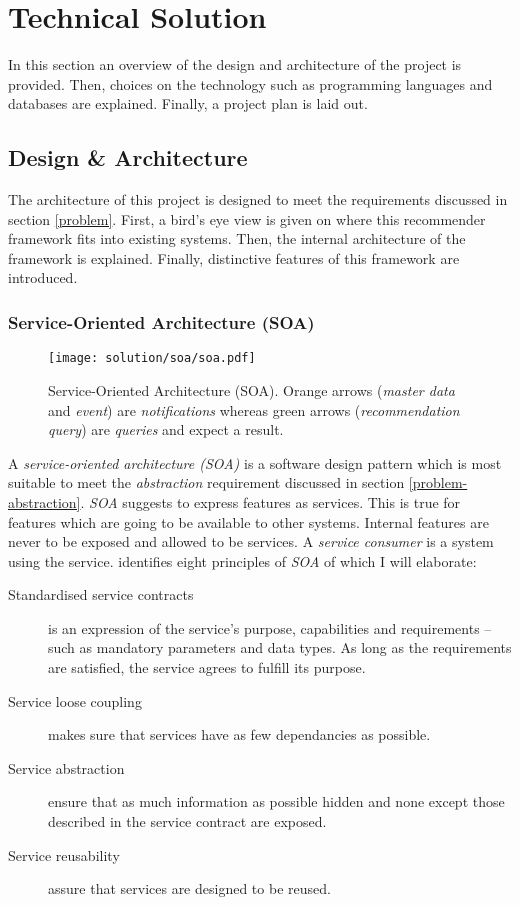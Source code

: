 \chapter{Technical Solution}

In this section an overview of the design and architecture of the project is provided. Then, choices on the technology such as programming languages and databases are explained. Finally, a project plan is laid out.



\section{Design \& Architecture}

The architecture of this project is designed to meet the requirements discussed in section \ref{problem}. First, a bird's eye view is given on where this recommender framework fits into existing systems. Then, the internal architecture of the framework is explained. Finally, distinctive features of this framework are introduced.

\subsection{Service-Oriented Architecture (SOA)}
\label{sol-design-soa}

\begin{figure}[ht]
    \texttt{[image: solution/soa/soa.pdf]}
    \caption[Service-Oriented Architecture (SOA)]{Service-Oriented Architecture (SOA). Orange arrows (\emph{master data} and \emph{event}) are \emph{notifications} whereas green arrows (\emph{recommendation query}) are \emph{queries} and expect a result.}
    \label{fig:soa}
\end{figure}

A \emph{service-oriented architecture (SOA)} is a software design pattern which is most suitable to meet the \emph{abstraction} requirement discussed in section \ref{problem-abstraction}. \emph{SOA} suggests to express features as services. This is true for features which are going to be available to other systems. Internal features are never to be exposed and allowed to be services. A \emph{service consumer} is a system using the service. \cite{erl08} identifies eight principles of \emph{SOA} of which I will elaborate:

\begin{description}
    \item[Standardised service contracts] is an expression of the service's purpose, capabilities and requirements -- such as mandatory parameters and data types. As long as the requirements are satisfied, the service agrees to fulfill its purpose.
    \item[Service loose coupling] makes sure that services have as few dependancies as possible.
    \item[Service abstraction] ensure that as much information as possible hidden and none except those described in the service contract are exposed.
    \item[Service reusability] assure that services are designed to be reused.
\end{description}

